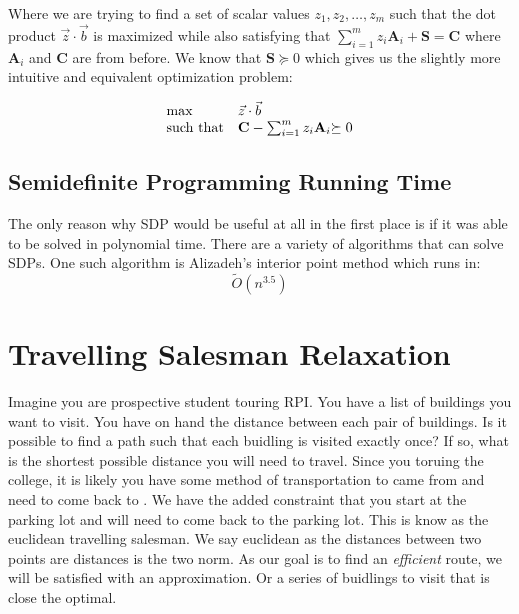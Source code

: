 \documentclass{article}
\begin{document}
Where we are trying to find a set of scalar values \( z_1, z_2, \ldots, z_m \) such that the dot product \( \vec{z} \cdot \vec{b} \) is maximized while also satisfying that \( \sum_{i=1}^m z_i \mathbf{A}_{i} + \mathbf{S} = \mathbf{C} \) where \( \mathbf{A}_i \) and \( \mathbf{C} \) are from before.
We know that \( \mathbf{S} \succeq 0 \) which gives us the slightly more intuitive and equivalent optimization problem:

\begin{align*}
  \begin{array}{ll@{}ll}
    \max              & \vec{z} \cdot \vec{b}                              & \\
    \text{such that}  & \mathbf{C} - \sum_{i=1}^m z_i \mathbf{A}_{i}  &\succeq 0 \\
  \end{array}
\end{align*}

\subsection{Semidefinite Programming Running Time}
The only reason why SDP would be useful at all in the first place is if it was able to be solved in polynomial time.
There are a variety of algorithms that can solve SDPs. 
One such algorithm is Alizadeh's interior point method \cite{Arora} which runs in:
\[ \tilde{O}(n^{3.5}) \]

\section{Travelling Salesman Relaxation}   %
Imagine you are prospective student touring RPI. You have a list of buildings you want to visit.
You have on hand the distance between each pair of buildings. 
Is it possible to find a path such that each buidling is visited exactly once? 
If so, what is the shortest possible distance you will need to travel. 
Since you toruing the college, it is likely you have some method of transportation to came from and need to come back to . 
We have the added constraint that you start at the parking lot and will need to come back to the parking lot.
This is know as the euclidean travelling salesman. We say euclidean as the distances between two points are distances is the 
two norm. 
As our goal is to find an \emph{efficient} route, we will be satisfied with an approximation. 
Or a series of buidlings to visit that is close the optimal.
\end{document}
